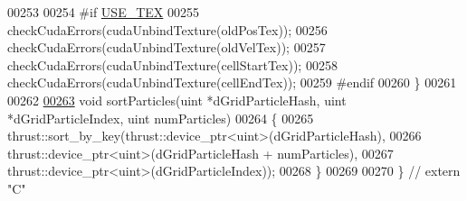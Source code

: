 \begin{DoxyCode}
00253 
00254 \textcolor{preprocessor}{#}\textcolor{preprocessor}{if} \hyperlink{particles__kernel_8cuh_a0ab211ca35e2616c721fcf2dd4f99c83}{USE\_TEX}
00255         checkCudaErrors(cudaUnbindTexture(oldPosTex));
00256         checkCudaErrors(cudaUnbindTexture(oldVelTex));
00257         checkCudaErrors(cudaUnbindTexture(cellStartTex));
00258         checkCudaErrors(cudaUnbindTexture(cellEndTex));
00259 \textcolor{preprocessor}{#}\textcolor{preprocessor}{endif}
00260     \}
00261 
00262 
\hypertarget{particle_system__cuda_8cu_source_l00263}{}\hyperlink{particle_system__cuda_8cu_ac71da7e4672a2732a098ba933a799257}{00263}     \textcolor{keywordtype}{void} sortParticles(uint *dGridParticleHash, uint *dGridParticleIndex, uint numParticles)
00264     \{
00265         thrust::sort\_by\_key(thrust::device\_ptr<uint>(dGridParticleHash),
00266                             thrust::device\_ptr<uint>(dGridParticleHash + numParticles),
00267                             thrust::device\_ptr<uint>(dGridParticleIndex));
00268     \}
00269 
00270 \}   \textcolor{comment}{// extern "C"}
\end{DoxyCode}
